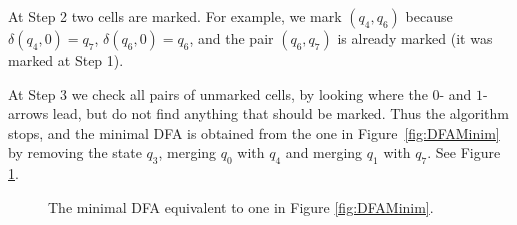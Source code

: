 \begin{exl}
At Step 2 two cells are marked.
For example, we mark $(q_4, q_6)$ because $\delta(q_4, 0) = q_7$, $\delta(q_6, 0) = q_6$, and the pair $(q_6, q_7)$ is already marked (it was marked at Step 1).

At Step 3 we check all pairs of unmarked cells, by looking where the $0$- and $1$-arrows lead, but do not find anything that should be marked.
Thus the algorithm stops, and the minimal DFA is obtained from the one in Figure~\ref{fig:DFAMinim} by removing the state $q_3$,
merging $q_0$ with $q_4$ and merging $q_1$ with $q_7$. See Figure \ref{fig:DFAMinimResult}.

\begin{figure}[ht]
\begin{center}

\end{center}
\caption{The minimal DFA equivalent to one in Figure \ref{fig:DFAMinim}.}
\label{fig:DFAMinimResult}
\end{figure}
\end{exl}